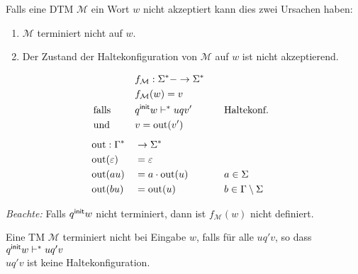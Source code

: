 Falls eine \ac{DTM} $\mathcal{M}$ ein Wort $w$ nicht akzeptiert kann dies zwei Ursachen haben:
\begin{enumerate}
 \item $\mathcal{M}$ terminiert nicht auf $w$.
 \item Der Zustand der Haltekonfiguration von $\mathcal{M}$ auf $w$ ist nicht akzeptierend.
\end{enumerate}


\begin{Def} %
	\begin{alignat*}{3}
		&&&f_\mathcal{M}:\Sigma^*- \->\Sigma^*\\
		&&&f_\mathcal{M}(w)=v\\
		&\text{ falls } &&\qinit w \vdash^*uqv'&\quad&\text{Haltekonf.}\\
		&\text{ und } &&v=\out( v')\\[.5em]
		&\out:\Gamma^* &&\-> \Sigma^*\\
		&\out(\Eps) &&= \Eps\\
		&\out(au) &&= a\cdot\out(u) &\quad& a\in\Sigma\\
		&\out(bu) &&= \out(u) && b\in\Gamma\setminus\Sigma
	\end{alignat*}
\end{Def}
\emph{Beachte:} Falls $q^\mathsf{init} w$ nicht terminiert, dann ist $f_\mathcal{M}(w)$ nicht definiert.

Eine \ac{TM} $\mathcal{M}$ terminiert nicht bei Eingabe $w$, falls für alle $uq'v$, so dass $q^\mathsf{init} w\vdash^*uq'v$\\
$uq'v$ ist keine Haltekonfiguration.

